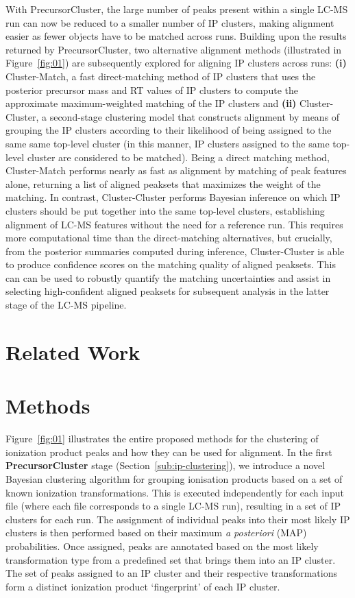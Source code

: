 With PrecursorCluster, the large number of peaks present within a single LC-MS run can now be reduced to a smaller number of IP clusters, making alignment easier as fewer objects have to be matched across runs. Building upon the results returned by PrecursorCluster, two alternative alignment methods (illustrated in Figure~\ref{fig:01}) are subsequently explored for aligning IP clusters across runs: \textbf{(i)} Cluster-Match, a fast direct-matching method of IP clusters that uses the posterior precursor mass and RT values of IP clusters to compute the approximate maximum-weighted matching of the IP clusters and \textbf{(ii)} Cluster-Cluster, a second-stage clustering model that constructs alignment by means of grouping the IP clusters according to their likelihood of being assigned to the same same top-level cluster (in this manner, IP clusters assigned to the same top-level cluster are considered to be matched). Being a direct matching method, Cluster-Match performs nearly as fast as alignment by matching of peak features alone, returning a list of aligned peaksets that maximizes the weight of the matching. In contrast, Cluster-Cluster performs Bayesian inference on which IP clusters should be put together into the same top-level clusters, establishing alignment of LC-MS features without the need for a reference run. This requires more computational time than the direct-matching alternatives, but crucially, from the posterior summaries computed during inference, Cluster-Cluster is able to produce confidence scores on the matching quality of aligned peaksets. This can can be used to robustly quantify the matching uncertainties and assist in selecting high-confident aligned peaksets for subsequent analysis in the latter stage of the LC-MS pipeline.

\section{Related Work}

\section{Methods}

Figure~\ref{fig:01} illustrates the entire proposed methods for the clustering of ionization product peaks and how they can be used for alignment. In the first \textbf{PrecursorCluster} stage (Section~\ref{sub:ip-clustering}), we introduce a novel Bayesian clustering algorithm for grouping ionisation products based on a set of known ionization transformations. This is executed independently for each input file (where each file corresponds to a single LC-MS run), resulting in a set of IP clusters for each run. The assignment of individual peaks into their most likely IP clusters is then performed based on their maximum \textit{a posteriori} (MAP) probabilities. Once assigned, peaks are annotated based on the most likely transformation type from a predefined set that brings them into an IP cluster. The set of peaks assigned to an IP cluster and their respective transformations form a distinct ionization product `fingerprint' of each IP cluster. 


